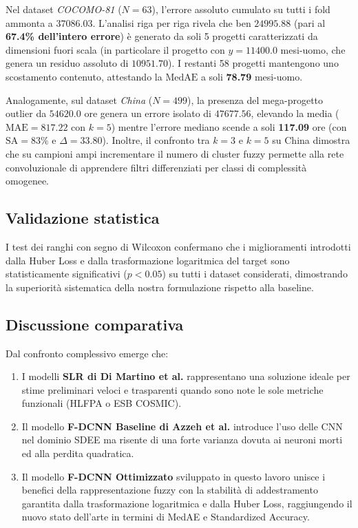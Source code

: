 \documentclass[11pt, a4paper]{article}
\begin{document}
Nel dataset \textit{COCOMO-81} ($N=63$), l'errore assoluto cumulato su tutti i
fold ammonta a $37086.03$. L'analisi riga per riga rivela che ben $24995.88$
(pari al \textbf{67.4\% dell'intero errore}) è generato da soli 5 progetti
caratterizzati da dimensioni fuori scala (in particolare il progetto con $y =
    11400.0$ mesi-uomo, che genera un residuo assoluto di $10951.70$). I restanti
58 progetti mantengono uno scostamento contenuto, attestando la $\text{MedAE}$
a soli \textbf{78.79} mesi-uomo.

Analogamente, sul dataset \textit{China} ($N=499$), la presenza del
mega-progetto outlier da $54620.0$ ore genera un errore isolato di $47677.56$,
elevando la media ($\text{MAE} = 817.22$ con $k=5$) mentre l'errore mediano
scende a soli \textbf{117.09} ore (con $\text{SA} = 83\%$ e $\Delta = 33.80$).
Inoltre, il confronto tra $k=3$ e $k=5$ su China dimostra che su campioni ampi
incrementare il numero di cluster fuzzy permette alla rete convoluzionale di
apprendere filtri differenziati per classi di complessità omogenee.

\subsection{Validazione statistica}
I test dei ranghi con segno di Wilcoxon confermano che i miglioramenti
introdotti dalla Huber Loss e dalla trasformazione logaritmica del target sono
statisticamente significativi ($p < 0.05$) su tutti i dataset considerati,
dimostrando la superiorità sistematica della nostra formulazione rispetto alla
baseline.

\subsection{Discussione comparativa}
Dal confronto complessivo emerge che:
\begin{enumerate}
    \item I modelli \textbf{SLR di Di Martino et al.} rappresentano una soluzione ideale
          per stime preliminari veloci e trasparenti quando sono note le sole metriche
          funzionali (HLFPA o ESB COSMIC).
    \item Il modello \textbf{F-DCNN Baseline di Azzeh et al.} introduce l'uso delle CNN
          nel dominio SDEE ma risente di una forte varianza dovuta ai neuroni morti ed
          alla perdita quadratica.
    \item Il modello \textbf{F-DCNN Ottimizzato} sviluppato in questo lavoro unisce i
          benefici della rappresentazione fuzzy con la stabilità di addestramento
          garantita dalla trasformazione logaritmica e dalla Huber Loss, raggiungendo il
          nuovo stato dell'arte in termini di MedAE e Standardized Accuracy.
\end{enumerate}
\end{document}
